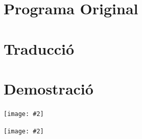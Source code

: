\documentclass[a4paper,12pt]{article}
\newcommand{\mygraphic}[2][width=\textwidth]{\begin{center}
		\centering\texttt{[image: \#2]}\par
\end{center}}
\begin{document}


\newpage
\section{Programa Original}


\newpage
\section{Traducció}


\newpage
\section{Demostració}
\mygraphic{demo1.png}
\mygraphic{demo2.png}
\end{document}
